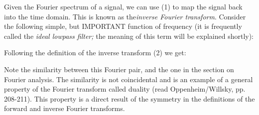\documentclass{article}
\begin{document}
\begin{CellGroup}


Given the Fourier spectrum of a signal, we can use (1) to map the signal back into the time domain. This is known as the{\itshape  inverse Fourier
transform}. Consider the following simple, but IMPORTANT function of frequency (it is frequently called the {\itshape ideal lowpass filter;} the
meaning of this term will be explained shortly):



Following the definition of the inverse transform (2) we get:

\begin{CellGroup}

\end{CellGroup}
\begin{CellGroup}

\end{CellGroup}
Note the similarity between this Fourier pair, and the one in the section on Fourier analysis. The similarity is not coincidental and is an example
of a general property of the Fourier transform called duality (read Oppenheim/Willsky, pp. 208-211). This property is a direct result of the symmetry
in the definitions of the forward and inverse Fourier transforms.


\end{CellGroup}
\end{document}
